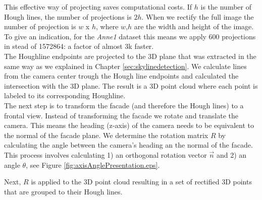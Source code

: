 This effective way of projecting saves computational costs.
If $h$ is the number of Hough lines, the number of projections is $2h$.
When we rectify the full image the number of projection is $w$ x $h$, where $w$,$h$ are the width and height of
the image. To give an indication, for the \emph{Anne1} dataset 
this means we apply 600 projections in stead of 1572864: a factor of almost 3k faster.\\

The Houghline endpoints are projected to the 3D plane that was extracted in the same
way as we explained in Chapter \ref{sec:skylinedetection}. We calculate lines 
from the camera center trough the Hough line endpoints and calculated the
intersection with the 3D plane.  The result is a 3D point cloud where each
point is labeled to its corresponding Houghline.\\

The next step is to transform the facade (and therefore the Hough lines) to a
frontal view. Instead of transforming the facade we rotate and translate the camera. 
This means the heading (z-axis) of the camera needs to be equivalent to the normal of the facade plane. 
We determine the rotation matrix $R$ by calculating the angle between the camera's heading an the normal of
the facade. This process involves calculating 1) an orthogonal rotation vector
$\vec{n}$ and 2) an angle $\theta$, see Figure \ref{fig:axisAnglePresentation.eps}.

 
Next, $R$ is applied to the 3D point cloud resulting in a set of rectified 3D
points that are grouped to their Hough lines.



